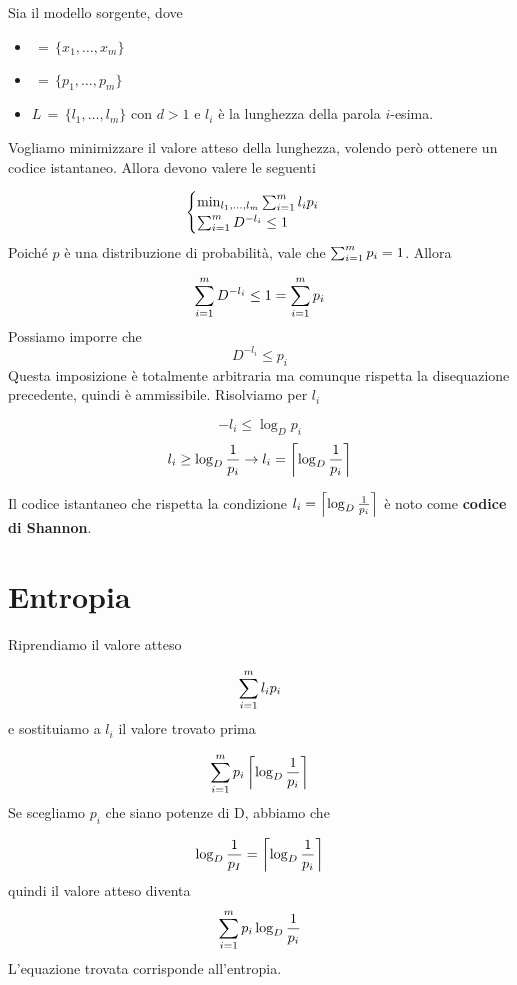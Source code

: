\documentclass[12pt]{report}
\begin{document}
    Sia \modello il modello sorgente, dove

    \begin{itemize}
        \item \sorgente $\,= \, \{x_1,\dots,x_m\}$
        \item \probabilita $\, = \,\{p_1,\dots,p_m\}$
        \item $L\, = \, \{l_1,\dots,l_m\}$ con $d>1$ e $l_i$ è la lunghezza della parola $i$-esima.
    \end{itemize}

    Vogliamo minimizzare il valore atteso della lunghezza, volendo però ottenere un codice istantaneo. Allora devono valere le seguenti

    $$\begin{cases}
          \min_{l_1,\dots,l_m} \sum_{i=1}^{m} l_i p_i \\
          \sum_{i=1}^{m} D^{-l_i} \leq 1
    \end{cases}$$
    Poiché $p$ è una distribuzione di probabilità, vale che $\sum_{i=1}^{m} p_i = 1$. Allora

    $$\sum_{i=1}^{m} D^{-l_i} \leq 1 = \sum_{i=1}^{m} p_i$$
    Possiamo imporre che
    $$D^{-l_i} \leq p_i $$
    Questa imposizione è totalmente arbitraria ma comunque rispetta la disequazione precedente, quindi è ammissibile.
    Risolviamo per $l_i$

    $$-l_i \leq \log_D{p_i}$$
    $$l_i \geq \log_D{\frac{1}{p_i}} \rightarrow l_i = \left\lceil \log_D{\frac{1}{p_i}} \right\rceil$$
    \begin{defi}
        Il codice istantaneo che rispetta la condizione $l_i = \left\lceil \log_D{\frac{1}{p_i}} \right\rceil$ è noto come \textbf{codice di Shannon}.
    \end{defi}



    \section{Entropia}
    Riprendiamo il valore atteso

    $$\sum_{i=1}^{m} l_i p_i$$
    e sostituiamo a $l_i$ il valore trovato prima

    $$\sum_{i=1}^{m} p_i \left\lceil \log_D{\frac{1}{p_i}} \right\rceil$$
    Se scegliamo $p_i$ che siano potenze di D, abbiamo che

    $$\log_D{\frac{1}{p_I}} = \left\lceil \log_D{\frac{1}{p_i}} \right\rceil$$
    quindi il valore atteso diventa
    $$\sum_{i=1}^{m} p_i \log_D{\frac{1}{p_i}}$$
    L'equazione trovata corrisponde all'entropia.
\end{document}
